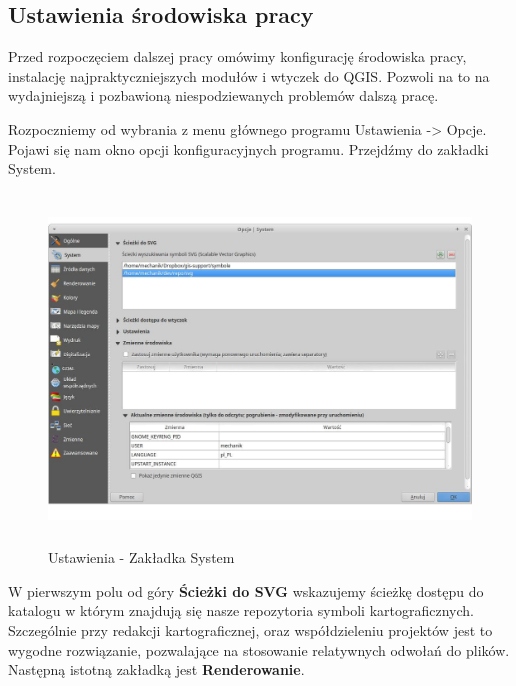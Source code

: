 \documentclass[12pt,a4paper]{book}
\begin{document}
\subsection{Ustawienia środowiska pracy}
Przed rozpoczęciem dalszej pracy omówimy konfigurację środowiska pracy, instalację najpraktyczniejszych modułów i wtyczek do QGIS. Pozwoli na to na wydajniejszą i pozbawioną niespodziewanych problemów dalszą pracę.

Rozpoczniemy od wybrania z menu głównego programu Ustawienia -{\textgreater} Opcje. Pojawi się nam okno opcji konfiguracyjnych programu. Przejdźmy do zakładki System. 

\begin{center}
\begin{figure}
\includegraphics[width=13.014cm,height=9.282cm]{002-zakladka-system.png}
\caption{Ustawienia - Zakładka System}
\end{figure}
\end{center}
W pierwszym polu od góry \textbf{Ścieżki do SVG }wskazujemy ścieżkę dostępu do katalogu w którym znajdują się nasze repozytoria symboli kartograficznych. Szczególnie przy redakcji kartograficznej, oraz współdzieleniu projektów jest to wygodne rozwiązanie, pozwalające na stosowanie relatywnych odwołań do plików. Następną istotną zakładką jest \textbf{Renderowanie}.
\end{document}
